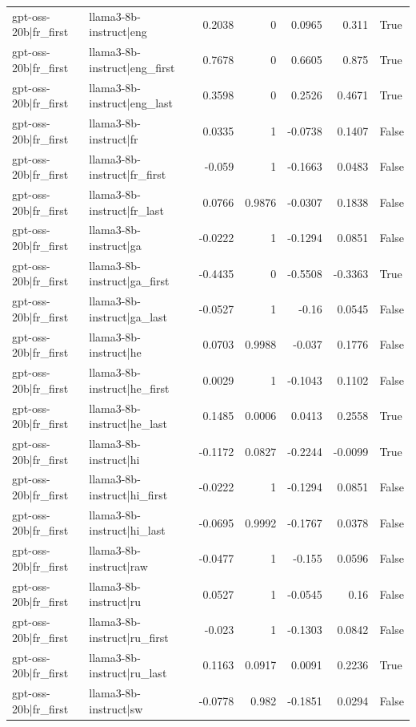 \begin{table}
\begin{tabular}{l l r r r r l}
gpt-oss-20b|fr_first & llama3-8b-instruct|eng & 0.2038 & 0 & 0.0965 & 0.311 & True \\
gpt-oss-20b|fr_first & llama3-8b-instruct|eng_first & 0.7678 & 0 & 0.6605 & 0.875 & True \\
gpt-oss-20b|fr_first & llama3-8b-instruct|eng_last & 0.3598 & 0 & 0.2526 & 0.4671 & True \\
gpt-oss-20b|fr_first & llama3-8b-instruct|fr & 0.0335 & 1 & -0.0738 & 0.1407 & False \\
gpt-oss-20b|fr_first & llama3-8b-instruct|fr_first & -0.059 & 1 & -0.1663 & 0.0483 & False \\
gpt-oss-20b|fr_first & llama3-8b-instruct|fr_last & 0.0766 & 0.9876 & -0.0307 & 0.1838 & False \\
gpt-oss-20b|fr_first & llama3-8b-instruct|ga & -0.0222 & 1 & -0.1294 & 0.0851 & False \\
gpt-oss-20b|fr_first & llama3-8b-instruct|ga_first & -0.4435 & 0 & -0.5508 & -0.3363 & True \\
gpt-oss-20b|fr_first & llama3-8b-instruct|ga_last & -0.0527 & 1 & -0.16 & 0.0545 & False \\
gpt-oss-20b|fr_first & llama3-8b-instruct|he & 0.0703 & 0.9988 & -0.037 & 0.1776 & False \\
gpt-oss-20b|fr_first & llama3-8b-instruct|he_first & 0.0029 & 1 & -0.1043 & 0.1102 & False \\
gpt-oss-20b|fr_first & llama3-8b-instruct|he_last & 0.1485 & 0.0006 & 0.0413 & 0.2558 & True \\
gpt-oss-20b|fr_first & llama3-8b-instruct|hi & -0.1172 & 0.0827 & -0.2244 & -0.0099 & True \\
gpt-oss-20b|fr_first & llama3-8b-instruct|hi_first & -0.0222 & 1 & -0.1294 & 0.0851 & False \\
gpt-oss-20b|fr_first & llama3-8b-instruct|hi_last & -0.0695 & 0.9992 & -0.1767 & 0.0378 & False \\
gpt-oss-20b|fr_first & llama3-8b-instruct|raw & -0.0477 & 1 & -0.155 & 0.0596 & False \\
gpt-oss-20b|fr_first & llama3-8b-instruct|ru & 0.0527 & 1 & -0.0545 & 0.16 & False \\
gpt-oss-20b|fr_first & llama3-8b-instruct|ru_first & -0.023 & 1 & -0.1303 & 0.0842 & False \\
gpt-oss-20b|fr_first & llama3-8b-instruct|ru_last & 0.1163 & 0.0917 & 0.0091 & 0.2236 & True \\
gpt-oss-20b|fr_first & llama3-8b-instruct|sw & -0.0778 & 0.982 & -0.1851 & 0.0294 & False \\

\end{tabular}
\end{table}
